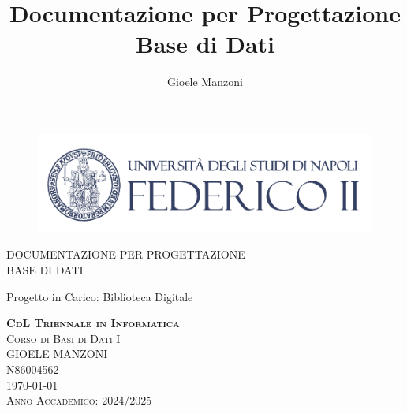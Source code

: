 \documentclass[a4paper, 15pt, oneside]{article}
\author{Gioele Manzoni}
\title{Documentazione per Progettazione Base di Dati}
\begin{document}
	\begin{center}
		\begin{figure}[hb]
			\includegraphics[width=1\textwidth]{../Immagini/coverpic.png}
		\end{figure}
		{\LARGE DOCUMENTAZIONE PER PROGETTAZIONE \\BASE DI DATI \par}
		{\Large{Progetto in Carico: Biblioteca Digitale \par}}
		\vfill
		{\large{ \textbf{\textsc{CdL Triennale in Informatica}}}}\\
		{\large{\textsc{Corso di Basi di Dati I}}}\\
		{\large{\textsc{GIOELE MANZONI}}}\\
		{\large{\textsc{N86004562}}}\\
		{\large{\textsc{\today}}}\\
		\Large{\textsc{Anno Accademico: 2024/2025}}
	\end{center}
	\newpage
	\tableofcontents
	\newpage
\end{document}
